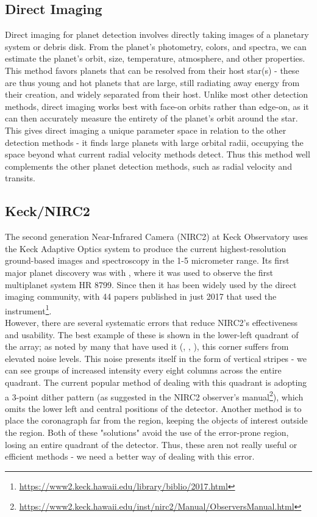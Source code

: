 \documentclass[twocolumn,longauthor]{aastex61}
\begin{document}
\subsection{Direct Imaging} \label{subsec:imaging}
\noindent Direct imaging for planet detection involves directly taking images of a planetary system or debris disk. From the planet's photometry, colors, and spectra, we can estimate the planet's orbit, size, temperature, atmosphere, and other properties. This method favors planets that can be resolved from their host star(s) - these are thus young and hot planets that are large, still radiating away energy from their creation, and widely separated from their host. Unlike most other detection methods, direct imaging works best with face-on orbits rather than edge-on, as it can then accurately measure the entirety of the planet's orbit around the star. This gives direct imaging a unique parameter space in relation to the other detection methods - it finds large planets with large orbital radii, occupying the space beyond what current radial velocity methods detect. Thus this method well complements the other planet detection methods, such as radial velocity and transits.


\subsection{Keck/NIRC2} \label{subsec:nirc2}
\noindent The second generation Near-Infrared Camera (NIRC2) at Keck Observatory uses the Keck Adaptive Optics system to produce the current highest-resolution ground-based images and spectroscopy in the 1-5 micrometer range. Its first major planet discovery was with \citet{2008Science..322..1348}, where it was used to observe the first multiplanet system HR 8799. Since then it has been widely used by the direct imaging community, with 44 papers published in just 2017 that used the instrument\footnote{\url{https://www2.keck.hawaii.edu/library/biblio/2017.html}}.\\
\indent However, there are several systematic errors that reduce NIRC2's effectiveness and usability. The best example of these is shown in the lower-left quadrant of the array; as noted by many that have used it (\citet{2015ApJS..216..53}, \citet{2017ApJ..153..255}, \citet{2017arXiv..1709.01957}), this corner suffers from elevated noise levels. This noise presents itself in the form of vertical stripes - we can see groups of increased intensity every eight columns across the entire quadrant. The current popular method of dealing with this quadrant is adopting a 3-point dither pattern (as suggested in the NIRC2 observer's manual\footnote{\url{https://www2.keck.hawaii.edu/inst/nirc2/Manual/ObserversManual.html}}), which omits the lower left and central positions of the detector. Another method is to place the coronagraph far from the region, keeping the objects of interest outside the region. Both of these "solutions" avoid the use of the error-prone region, losing an entire quadrant of the detector. Thus, these aren not really useful or efficient methods - we need a better way of dealing with this error.
\end{document}
